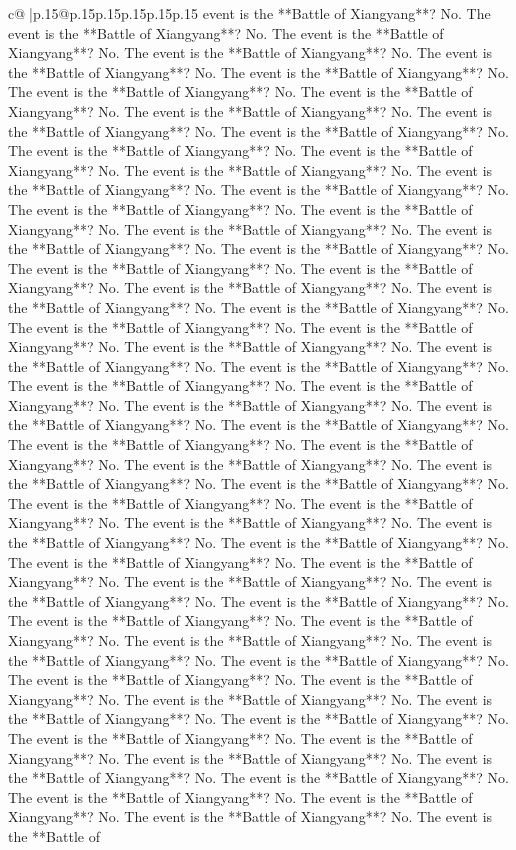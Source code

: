\documentclass{article}
\begin{document}
{\begin{supertabular}{c@{$\;$}|p{.15\linewidth}@{}p{.15\linewidth}p{.15\linewidth}p{.15\linewidth}p{.15\linewidth}p{.15\linewidth}}
{{{event is the **Battle of Xiangyang**? No. The event is the **Battle of Xiangyang**? No. The event is the **Battle of Xiangyang**? No. The event is the **Battle of Xiangyang**? No. The event is the **Battle of Xiangyang**? No. The event is the **Battle of Xiangyang**? No. The event is the **Battle of Xiangyang**? No. The event is the **Battle of Xiangyang**? No. The event is the **Battle of Xiangyang**? No. The event is the **Battle of Xiangyang**? No. The event is the **Battle of Xiangyang**? No. The event is the **Battle of Xiangyang**? No. The event is the **Battle of Xiangyang**? No. The event is the **Battle of Xiangyang**? No. The event is the **Battle of Xiangyang**? No. The event is the **Battle of Xiangyang**? No. The event is the **Battle of Xiangyang**? No. The event is the **Battle of Xiangyang**? No. The event is the **Battle of Xiangyang**? No. The event is the **Battle of Xiangyang**? No. The event is the **Battle of Xiangyang**? No. The event is the **Battle of Xiangyang**? No. The event is the **Battle of Xiangyang**? No. The event is the **Battle of Xiangyang**? No. The event is the **Battle of Xiangyang**? No. The event is the **Battle of Xiangyang**? No. The event is the **Battle of Xiangyang**? No. The event is the **Battle of Xiangyang**? No. The event is the **Battle of Xiangyang**? No. The event is the **Battle of Xiangyang**? No. The event is the **Battle of Xiangyang**? No. The event is the **Battle of Xiangyang**? No. The event is the **Battle of Xiangyang**? No. The event is the **Battle of Xiangyang**? No. The event is the **Battle of Xiangyang**? No. The event is the **Battle of Xiangyang**? No. The event is the **Battle of Xiangyang**? No. The event is the **Battle of Xiangyang**? No. The event is the **Battle of Xiangyang**? No. The event is the **Battle of Xiangyang**? No. The event is the **Battle of Xiangyang**? No. The event is the **Battle of Xiangyang**? No. The event is the **Battle of Xiangyang**? No. The event is the **Battle of Xiangyang**? No. The event is the **Battle of Xiangyang**? No. The event is the **Battle of Xiangyang**? No. The event is the **Battle of Xiangyang**? No. The event is the **Battle of Xiangyang**? No. The event is the **Battle of Xiangyang**? No. The event is the **Battle of Xiangyang**? No. The event is the **Battle of Xiangyang**? No. The event is the **Battle of Xiangyang**? No. The event is the **Battle of Xiangyang**? No. The event is the **Battle of Xiangyang**? No. The event is the **Battle of Xiangyang**? No. The event is the **Battle of Xiangyang**? No. The event is the **Battle of Xiangyang**? No. The event is the **Battle of Xiangyang**? No. The event is the **Battle of Xiangyang**? No. The event is the **Battle of Xiangyang**? No. The event is the **Battle of Xiangyang**? No. The event is the **Battle of Xiangyang**? No. The event is the **Battle of Xiangyang**? No. The event is the **Battle of Xiangyang**? No. The event is the **Battle of Xiangyang**? No. The event is the **Battle of Xiangyang**? No. The event is the **Battle of Xiangyang**? No. The event is the **Battle of Xiangyang**? No. The event is the **Battle of Xiangyang**? No. The event is the **Battle of }}}
\end{supertabular}}
\end{document}
